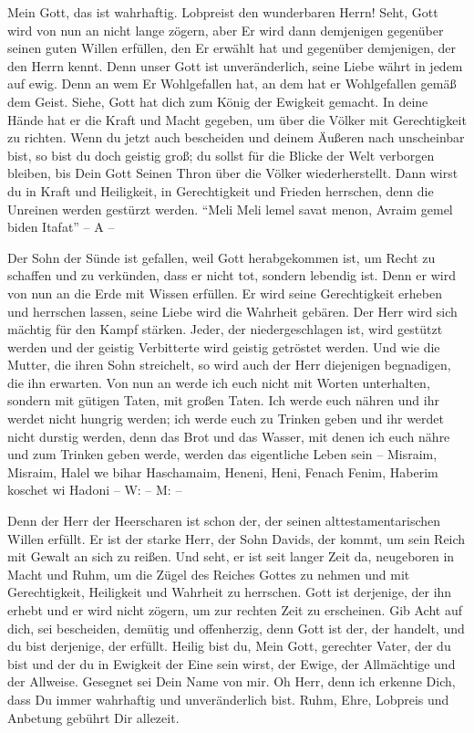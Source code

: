         Mein Gott, das ist wahrhaftig. Lobpreist den wunderbaren Herrn! Seht, Gott wird von nun an nicht lange zögern, aber Er wird dann demjenigen gegenüber seinen guten Willen erfüllen, den Er erwählt hat und gegenüber demjenigen, der den Herrn kennt. Denn unser Gott ist unveränderlich, seine Liebe währt in jedem auf ewig. Denn an wem Er Wohlgefallen hat, an dem hat er Wohlgefallen gemäß dem Geist. Siehe, Gott hat dich zum König der Ewigkeit gemacht. In deine Hände hat er die Kraft und Macht gegeben, um über die Völker mit Gerechtigkeit zu richten. Wenn du jetzt auch bescheiden und deinem Äußeren nach unscheinbar bist, so bist du doch geistig groß; du sollst für die Blicke der Welt verborgen bleiben, bis Dein Gott Seinen Thron über die Völker wiederherstellt. Dann wirst du in Kraft und Heiligkeit, in Gerechtigkeit und Frieden herrschen, denn die Unreinen werden gestürzt werden. "`Meli Meli lemel savat menon, Avraim gemel biden Itafat"' -- A -- 
        
        Der Sohn der Sünde ist gefallen, weil Gott herabgekommen ist, um Recht zu schaffen und zu verkünden, dass er nicht tot, sondern lebendig ist. Denn er wird von nun an die Erde mit Wissen erfüllen. Er wird seine Gerechtigkeit erheben und herrschen lassen, seine Liebe wird die Wahrheit gebären. Der Herr wird sich mächtig für den Kampf stärken. Jeder, der niedergeschlagen ist, wird gestützt werden und der geistig Verbitterte wird geistig getröstet werden. Und wie die Mutter, die ihren Sohn streichelt, so wird auch der Herr diejenigen begnadigen, die ihn erwarten. Von nun an werde ich euch nicht mit Worten unterhalten, sondern mit gütigen Taten, mit großen Taten. Ich werde euch nähren und ihr werdet nicht hungrig werden; ich werde euch zu Trinken geben und ihr werdet nicht durstig werden, denn das Brot und das Wasser, mit denen ich euch nähre und zum Trinken geben werde, werden das eigentliche Leben sein -- Misraim, Misraim, Halel we bihar Haschamaim, Heneni, Heni, Fenach Fenim, Haberim koschet wi Hadoni -- W: -- M: -- 
        
        Denn der Herr der Heerscharen ist schon der, der seinen alttestamentarischen Willen erfüllt. Er ist der starke Herr, der Sohn Davids, der kommt, um sein Reich mit Gewalt an sich zu reißen. Und seht, er ist seit langer Zeit da, neugeboren in Macht und Ruhm, um die Zügel des Reiches Gottes zu nehmen und mit Gerechtigkeit, Heiligkeit und Wahrheit zu herrschen. Gott ist derjenige, der ihn erhebt und er wird nicht zögern, um zur rechten Zeit zu erscheinen. Gib Acht auf dich, sei bescheiden, demütig und offenherzig, denn Gott ist der, der handelt, und du bist derjenige, der erfüllt. Heilig bist du, Mein Gott, gerechter Vater, der du bist und der du in Ewigkeit der Eine sein wirst, der Ewige, der Allmächtige und der Allweise. Gesegnet sei Dein Name von mir. Oh Herr, denn ich erkenne Dich, dass Du immer wahrhaftig und unveränderlich bist. Ruhm, Ehre, Lobpreis und Anbetung gebührt Dir allezeit. 
        
